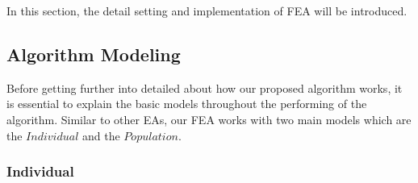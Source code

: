 \documentclass[final]{elsarticle}
\begin{document}
In this section, the detail setting and implementation of FEA will be introduced.

\subsection{Algorithm Modeling}

Before getting further into detailed about how our proposed algorithm works, it is essential to explain the basic models throughout the performing of the algorithm. Similar to other EAs, our FEA works with two main models which are the $ Individual $ and the $ Population $.

\subsubsection{Individual}
\end{document}

